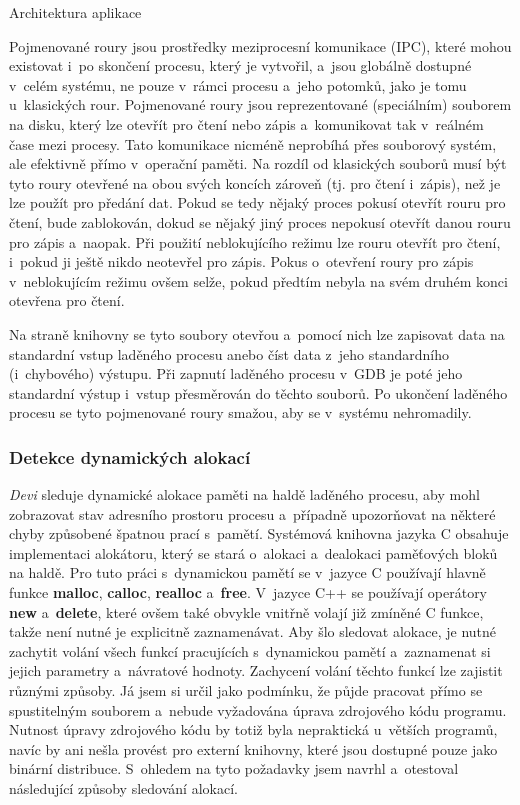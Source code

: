 \documentclass[czech,bachelor,male,python,dept460,hidelinks]{diploma}						%
\newcommand{\parspace}[1][]{
	\ifthenelse{\isempty{#1}}{\vspace{0mm}}{\vspace{#1}}
	\par
}
\begin{document}
\begin{section}{Architektura aplikace}
			\parspace Pojmenované roury jsou prostředky meziprocesní komunikace (IPC), které mohou existovat i~po skončení procesu, který je vytvořil, a~jsou globálně
			dostupné v~celém systému, ne pouze v~rámci procesu a~jeho potomků, jako je tomu u~klasických rour. Pojmenované roury jsou reprezentované (speciálním)
			souborem na disku, který lze otevřít pro čtení nebo zápis a~komunikovat tak v~reálném čase mezi procesy. Tato komunikace nicméně neprobíhá 
			přes souborový systém, ale efektivně přímo v~operační paměti. \cite{fifo}
			Na rozdíl od klasických souborů musí být tyto roury otevřené na obou svých koncích zároveň (tj. pro čtení i~zápis), než je lze použít pro předání dat.
			Pokud se tedy nějaký proces pokusí otevřít rouru pro čtení, bude zablokován, dokud se nějaký jiný proces nepokusí otevřít danou
			rouru pro zápis a~naopak. Při použití neblokujícího režimu lze rouru otevřít pro čtení, i~pokud ji ještě nikdo neotevřel pro zápis.
			Pokus o~otevření roury pro zápis v~neblokujícím režimu ovšem selže, pokud předtím nebyla na svém druhém konci otevřena pro čtení. \cite{fifo}
			
			\parspace Na straně knihovny se tyto soubory otevřou a~pomocí nich lze zapisovat data na standardní vstup laděného procesu anebo číst data z~jeho
			standardního (i~chybového) výstupu. Při zapnutí laděného procesu v~GDB je poté jeho standardní výstup i~vstup přesměrován do těchto souborů.
			Po ukončení laděného procesu se tyto pojmenované roury smažou, aby se v~systému nehromadily.
			
			
		\subsubsection{Detekce dynamických alokací}
			\textit{Devi} sleduje dynamické alokace paměti na haldě laděného procesu, aby mohl zobrazovat stav adresního prostoru procesu a~případně upozorňovat na
			některé chyby způsobené špatnou prací s~pamětí. Systémová knihovna jazyka C obsahuje implementaci alokátoru, který se stará o~alokaci a~dealokaci paměťových
			bloků na haldě. Pro tuto práci s~dynamickou pamětí se v~jazyce C používají hlavně funkce \textbf{malloc}, \textbf{calloc}, \textbf{realloc}
			a~\textbf{free}. V~jazyce C++ se používají operátory \textbf{new} a~\textbf{delete}, které ovšem také obvykle vnitřně volají již zmíněné C funkce,
			takže není nutné je explicitně zaznamenávat. Aby šlo sledovat alokace, je nutné zachytit volání všech funkcí pracujících s~dynamickou pamětí a~zaznamenat si
			jejich parametry a~návratové hodnoty. Zachycení volání těchto funkcí lze zajistit různými způsoby. Já jsem si určil jako podmínku, že půjde pracovat
			přímo se spustitelným souborem a~nebude vyžadována úprava zdrojového kódu programu.
			Nutnost úpravy zdrojového kódu by totiž byla nepraktická u~větších programů, navíc by ani nešla provést pro externí knihovny, které jsou dostupné pouze
			jako binární distribuce.
			S~ohledem na tyto požadavky jsem navrhl a~otestoval následující způsoby sledování alokací.

\end{section}
\end{document}

